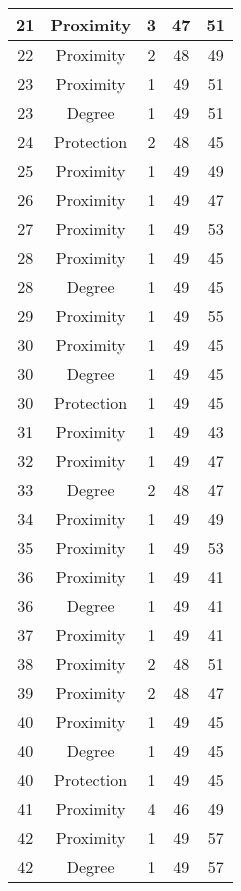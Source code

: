 \documentclass[results.tex]{subfiles}
\begin{document}
\begin{center}
\begin{tabular}{| c || c | c | c | c |}
    \hline
    21 & Proximity & 3 & 47 & 51 \\ 
    \hline
    22 & Proximity & 2 & 48 & 49 \\ 
    \hline
    23 & Proximity & 1 & 49 & 51 \\ 
    \hline
    23 & Degree & 1 & 49 & 51 \\ 
    \hline
    24 & Protection & 2 & 48 & 45 \\ 
    \hline
    25 & Proximity & 1 & 49 & 49 \\ 
    \hline
    26 & Proximity & 1 & 49 & 47 \\ 
    \hline
    27 & Proximity & 1 & 49 & 53 \\ 
    \hline
    28 & Proximity & 1 & 49 & 45 \\ 
    \hline
    28 & Degree & 1 & 49 & 45 \\ 
    \hline
    29 & Proximity & 1 & 49 & 55 \\ 
    \hline
    30 & Proximity & 1 & 49 & 45 \\ 
    \hline
    30 & Degree & 1 & 49 & 45 \\ 
    \hline
    30 & Protection & 1 & 49 & 45 \\ 
    \hline
    31 & Proximity & 1 & 49 & 43 \\ 
    \hline
    32 & Proximity & 1 & 49 & 47 \\ 
    \hline
    33 & Degree & 2 & 48 & 47 \\ 
    \hline
    34 & Proximity & 1 & 49 & 49 \\ 
    \hline
    35 & Proximity & 1 & 49 & 53 \\ 
    \hline
    36 & Proximity & 1 & 49 & 41 \\ 
    \hline
    36 & Degree & 1 & 49 & 41 \\ 
    \hline
    37 & Proximity & 1 & 49 & 41 \\ 
    \hline
    38 & Proximity & 2 & 48 & 51 \\ 
    \hline
    39 & Proximity & 2 & 48 & 47 \\ 
    \hline
    40 & Proximity & 1 & 49 & 45 \\ 
    \hline
    40 & Degree & 1 & 49 & 45 \\ 
    \hline
    40 & Protection & 1 & 49 & 45 \\ 
    \hline
    41 & Proximity & 4 & 46 & 49 \\ 
    \hline
    42 & Proximity & 1 & 49 & 57 \\ 
    \hline
    42 & Degree & 1 & 49 & 57 \\ 

\end{tabular}
\end{center}
\end{document}
